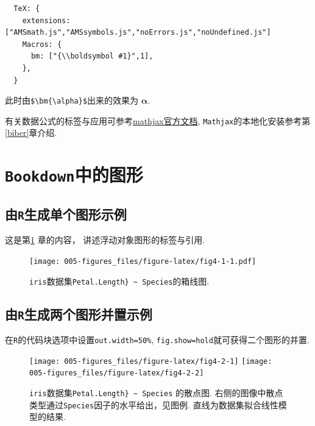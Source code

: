 \documentclass[12pt,]{krantz}
\theoremstyle{plain}
\theoremstyle{nonumberplain}
\begin{document}
\begin{verbatim}
  TeX: {
    extensions: ["AMSmath.js","AMSsymbols.js","noErrors.js","noUndefined.js"]
    Macros: {
      bm: ["{\\boldsymbol #1}",1],
    },
  }
\end{verbatim}

此时由\texttt{\$\textbackslash{}bm\{\textbackslash{}alpha\}\$}出来的效果为 \(\bm{\alpha}\).

有关数据公式的标签与应用可参考\href{https://www.mathjax.org/}{mathjax官方文档}, \texttt{Mathjax}的本地化安装参考第\ref{biber}章介绍.

\printbibliography[segment=\therefsegment, heading=subbibliography, title={参考文献}]

\hypertarget{figures}{%
\chapter{\texorpdfstring{\texttt{Bookdown}中的图形}{Bookdown中的图形}}\label{figures}}

\hypertarget{sec5-1}{%
\section{\texorpdfstring{由\texttt{R}生成单个图形示例}{由R生成单个图形示例}}\label{sec5-1}}

\indent

这是第\ref{figures} 章的内容， 讲述浮动对象图形的标签与引用. \autocite{xie2015,bookdown2016}



\begin{figure}
\centering
\texttt{[image: 005-figures\_files/figure-latex/fig4-1-1.pdf]}
\caption{\label{fig:fig4-1}\texttt{iris}数据集\texttt{Petal.Length\}\ \textasciitilde{}\ Species}的箱线图.}
\end{figure}

\hypertarget{sec5-2}{%
\section{\texorpdfstring{由\texttt{R}生成两个图形并置示例}{由R生成两个图形并置示例}}\label{sec5-2}}

在\texttt{R}的代码块选项中设置\texttt{out.width=\textquotesingle{}50\%\textquotesingle{}}, \texttt{fig.show=\textquotesingle{}hold\textquotesingle{}}就可获得二个图形的并置.



\begin{figure}
\texttt{[image: 005-figures\_files/figure-latex/fig4-2-1]} \texttt{[image: 005-figures\_files/figure-latex/fig4-2-2]} \caption{\texttt{iris}数据集\texttt{Petal.Length\}\ \textasciitilde{}\ Species} 的散点图. 右侧的图像中散点类型通过\texttt{Species}因子的水平给出，见图例. 直线为数据集拟合线性模型的结果.}\label{fig:fig4-2}
\end{figure}
\end{document}
